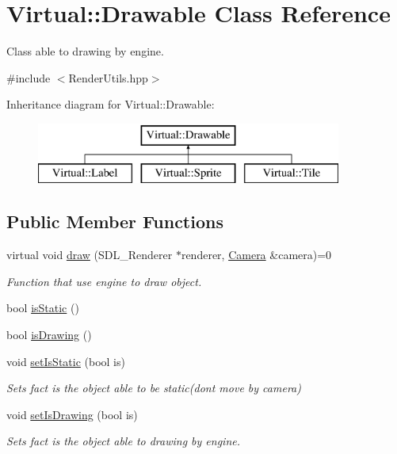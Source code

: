 \hypertarget{class_virtual_1_1_drawable}{}\section{Virtual\+:\+:Drawable Class Reference}
\label{class_virtual_1_1_drawable}


Class able to drawing by engine.  




{\ttfamily \#include $<$Render\+Utils.\+hpp$>$}

Inheritance diagram for Virtual\+:\+:Drawable\+:\begin{figure}[H]
\begin{center}
\leavevmode
\includegraphics[height=2.000000cm]{class_virtual_1_1_drawable}
\end{center}
\end{figure}
\subsection*{Public Member Functions}
\begin{DoxyCompactItemize}
\item 
virtual void \hyperlink{class_virtual_1_1_drawable_af7014800911efa59b96e538149e56f8b}{draw} (S\+D\+L\+\_\+\+Renderer $\ast$renderer, \hyperlink{class_virtual_1_1_camera}{Camera} \&camera)=0
\begin{DoxyCompactList}\small\item\em Function that use engine to draw object. \end{DoxyCompactList}\item 
bool \hyperlink{class_virtual_1_1_drawable_a7901d5ac8f7ebed5e3d5773c9699ca7c}{is\+Static} ()
\item 
bool \hyperlink{class_virtual_1_1_drawable_a47902855528332fd79595db7dacca2ed}{is\+Drawing} ()
\item 
void \hyperlink{class_virtual_1_1_drawable_a94ed4174ab71aa5aea957d821bc8d170}{set\+Is\+Static} (bool is)
\begin{DoxyCompactList}\small\item\em Sets fact is the object able to be static(don\textquotesingle{}t move by camera) \end{DoxyCompactList}\item 
void \hyperlink{class_virtual_1_1_drawable_af47ef44ac82ef8f11873fcf3e7a4aaa0}{set\+Is\+Drawing} (bool is)
\begin{DoxyCompactList}\small\item\em Sets fact is the object able to drawing by engine. \end{DoxyCompactList}\end{DoxyCompactItemize}
